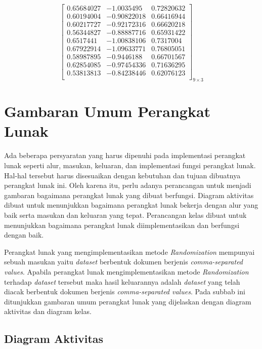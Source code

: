 \begin{enumerate}
\begin{equation}
\begin{bmatrix}
        0.65684027 &  -1.0035495   &  0.72820632 \\
        0.60194004 &  -0.90822018  &  0.66416944 \\
        0.60217727  & -0.92172316  &  0.66620218 \\
        0.56344827 &  -0.88887716  &  0.65931422 \\
        0.6517441   & -1.00838106  &  0.7317004  \\
        0.67922914  & -1.09633771  &  0.76805051 \\
        0.58987895  & -0.9446188   &  0.66701567 \\
        0.62854085  & -0.97454336  &  0.71636295 \\
        0.53813813  & -0.84238446  &  0.62076123 \\
        \end{bmatrix}_{9\times 3}
    \end{equation}
\end{enumerate}

\section{Gambaran Umum Perangkat Lunak}
\label{sec:gambaran-pl}

Ada beberapa persyaratan yang harus dipenuhi pada implementasi perangkat lunak seperti alur, masukan, keluaran, dan implementasi fungsi perangkat lunak. Hal-hal tersebut harus disesuaikan dengan kebutuhan dan tujuan dibuatnya perangkat lunak ini. Oleh karena itu, perlu adanya perancangan untuk menjadi gambaran bagaimana perangkat lunak yang dibuat berfungsi. Diagram aktivitas dibuat untuk menunjukkan bagaimana perangkat lunak bekerja dengan alur yang baik serta masukan dan keluaran yang tepat. Perancangan kelas dibuat untuk menunjukkan bagaimana perangkat lunak diimplementasikan dan berfungsi dengan baik.

Perangkat lunak yang mengimplementasikan metode \textit{Randomization} mempunyai sebuah masukan yaitu \textit{dataset} berbentuk dokumen berjenis \textit{comma-separated values}. Apabila perangkat lunak mengimplementasikan metode \textit{Randomization} terhadap \textit{dataset} tersebut maka hasil keluarannya adalah \textit{dataset} yang telah diacak berbentuk dokumen berjenis \textit{comma-separated values}. Pada subbab ini ditunjukkan gambaran umum perangkat lunak yang dijelaskan dengan diagram aktivitas dan diagram kelas.

\subsection{Diagram Aktivitas}
\label{subsec:diagram-aktivitas}

